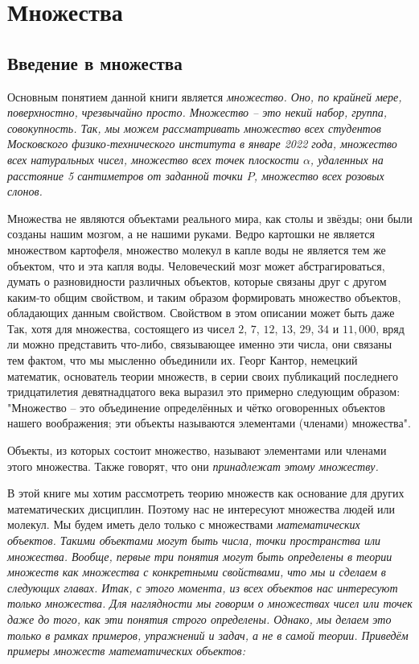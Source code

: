 \documentclass[a4paper, 12pt]{extreport}
\begin{document}
\chapter{Множества}

\section{Введение в множества}

Основным понятием данной книги является \itshape множество\normalfont{}. Оно, по крайней мере, поверхностно, чрезвычайно просто. Множество -- это некий набор, группа, совокупность. Так, мы можем рассматривать множество всех студентов Московского физико-технического института в январе 2022 года, множество всех натуральных чисел, множество всех точек плоскости $\alpha$, удаленных на расстояние 5 сантиметров от заданной точки $P$, множество всех розовых слонов. \par
Множества не являются объектами реального мира, как столы и звёзды; они были созданы нашим мозгом, а не нашими руками. Ведро картошки не является множеством картофеля, множество молекул в капле воды не является тем же объектом, что и эта капля воды. Человеческий мозг может абстрагироваться, думать о разновидности различных объектов, которые связаны друг с другом каким-то общим свойством, и таким образом формировать множество объектов, обладающих данным свойством. Свойством в этом описании может быть даже  Так, хотя для множества, состоящего из чисел $2$, $7$, $12$, $13$, $29$, $34$ и $11,000$, вряд ли можно представить что-либо, связывающее именно эти числа, они связаны тем фактом, что мы мысленно объединили их. Георг Кантор, немецкий математик, основатель теории множеств, в серии своих публикаций последнего тридцатилетия девятнадцатого века выразил это примерно следующим образом: "Множество -- это объединение определённых и чётко оговоренных объектов нашего воображения; эти объекты называются элементами (членами) множества". \par
Объекты, из которых состоит множество, называют элементами или членами этого множества. Также говорят, что они \itshape принадлежат\normalfont{} этому множеству. \par
В этой книге мы хотим рассмотреть теорию множеств как основание для других математических дисциплин. Поэтому нас не интересуют множества людей или молекул. Мы будем иметь дело только с множествами \itshape математических\normalfont{} объектов. Такими объектами могут быть числа, точки пространства или множества. Вообще, первые три понятия могут быть определены в теории множеств как множества с конкретными свойствами, что мы и сделаем в следующих главах. Итак, с этого момента, из всех объектов нас интересуют только множества. Для наглядности мы говорим о множествах чисел или точек даже до того, как эти понятия строго определены. Однако, мы делаем это только в рамках примеров, упражнений и задач, а не в самой теории. Приведём примеры множеств математических объектов: \par
\end{document}
